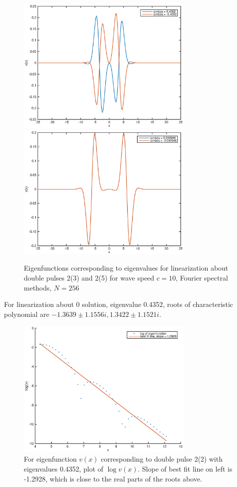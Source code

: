 \documentclass[12pt]{article}
\begin{document}
\begin{figure}[H]
	\includegraphics[width=8.5cm]{four10dp1eigenfns}
	\includegraphics[width=8.5cm]{four10dp3eigenfns}
	\caption{Eigenfunctions corresponding to eigenvalues for linearization about double pulses 2(3) and 2(5) for wave speed $c = 10$, Fourier spectral methods, $N = 256$}
\end{figure}

For linearization about 0 solution, eigenvalue 0.4352, roots of characteristic polynomial are $-1.3639 \pm 1.1556i, 1.3422 \pm 1.1521i$.

\begin{figure}[H]
	\includegraphics[width=8.5cm]{decayeigenfunction}
	\caption{For eigenfunction $v(x)$ corresponding to double pulse 2(2) with eigenvalues 0.4352, plot of $\log v(x)$. Slope of best fit line on left is -1.2928, which is close to the real parts of the roots above.}
\end{figure}
\end{document}
